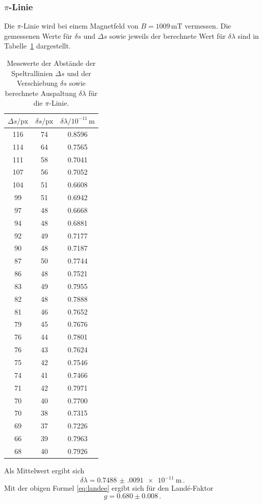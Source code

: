 \subsubsection*{$\pi$-Linie}
Die $\pi$-Linie wird bei einem Magnetfeld von $B = 1009 \, \si{\milli\tesla}$ vermessen.
Die gemessenen Werte für 
$\delta s$ und $\Delta s$ sowie jeweils der berechnete Wert für $\delta \lambda$ sind in Tabelle \ref{tab:atab3} dargestellt.
\FloatBarrier
\begin{table}[h]
    \centering
    \caption{Messwerte der Abstände der Speltrallinien $\Delta s$ und der Verschiebung $\delta s$ sowie berechnete Auspaltung $\delta \lambda$ für die $\pi$-Linie.}
    \label{tab:atab3}
    \begin{tabular}{c c c}
        \toprule
        {$\Delta s / \text{px}$} & {$\delta s / \text{px}$} & {$\delta \lambda / 10^{-11}\, \si{\meter}$}\\
        \midrule
        116 & 74 & 0.8596 \\
        114 & 64 & 0.7565 \\
        111 & 58 & 0.7041 \\
        107 & 56 & 0.7052 \\
        104 & 51 & 0.6608 \\
        99  & 51 & 0.6942 \\
        97  & 48 & 0.6668 \\
        94  & 48 & 0.6881 \\
        92  & 49 & 0.7177 \\
        90  & 48 & 0.7187 \\
        87  & 50 & 0.7744 \\
        86  & 48 & 0.7521 \\
        83  & 49 & 0.7955 \\
        82  & 48 & 0.7888 \\
        81  & 46 & 0.7652 \\
        79  & 45 & 0.7676 \\
        76  & 44 & 0.7801 \\
        76  & 43 & 0.7624 \\
        75  & 42 & 0.7546 \\
        74  & 41 & 0.7466 \\
        71  & 42 & 0.7971 \\
        70  & 40 & 0.7700 \\
        70  & 38 & 0.7315 \\
        69  & 37 & 0.7226 \\
        66  & 39 & 0.7963 \\
        68  & 40 & 0.7926 \\
        \bottomrule
    \end{tabular}
\end{table}
\FloatBarrier
\noindent
Als Mittelwert ergibt sich
\begin{equation*}
    \delta \lambda = \SI{0.7488(0091)e-11}{\meter} \, .
\end{equation*}
Mit der obigen Formel \eqref{eq:landee} ergibt sich für den Landé-Faktor
\begin{equation*}
    g = 0.680 \pm 0.008 \, .
\end{equation*}

